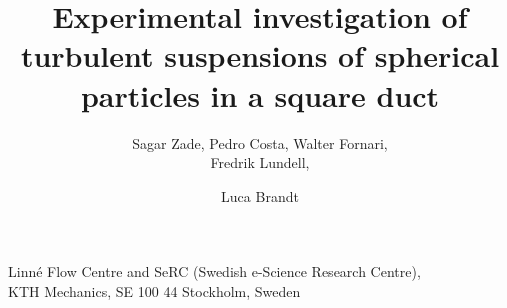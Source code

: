 \documentclass{jfm}
\begin{document}
\newtheorem{lemma}{Lemma}
\newtheorem{corollary}{Corollary}


\title{Experimental investigation of turbulent suspensions of spherical particles in a square duct}

\author
 {
 Sagar Zade,
 Pedro Costa,
 Walter Fornari,\\
 Fredrik Lundell,
 \and
 Luca Brandt
  }

\affiliation
{
Linn\'e Flow Centre and SeRC (Swedish e-Science Research Centre), \\ KTH Mechanics, SE 100 44 Stockholm, Sweden
}

\maketitle
\end{document}
